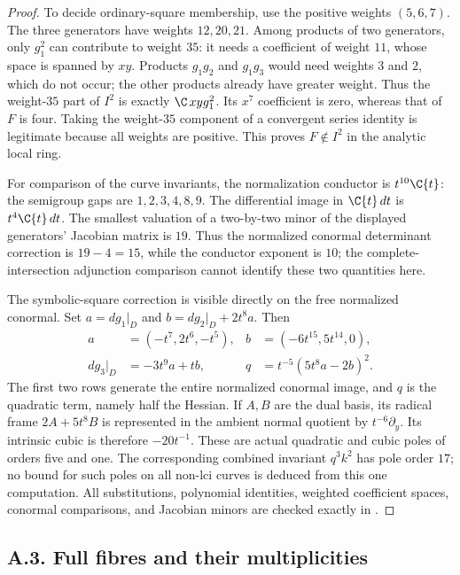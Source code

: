 \begin{proof}
To decide ordinary-square membership, use the positive weights
$(5,6,7)$. The three generators have weights $12,20,21$.
Among products of two generators, only $g_1^2$ can contribute
to weight $35$: it needs a coefficient of weight $11$, whose
space is spanned by $xy$. Products $g_1g_2$ and $g_1g_3$ would
need weights $3$ and $2$, which do not occur; the other products
already have greater weight. Thus the weight-$35$ part of $I^2$
is exactly $\C\,xyg_1^2$. Its $x^7$ coefficient is zero, whereas
that of $F$ is four. Taking the weight-$35$ component of a
convergent series identity is legitimate because all weights are
positive. This proves $F\notin I^2$ in the analytic local ring.

For comparison of the curve invariants, the normalization conductor
is $t^{10}\C\{t\}$: the semigroup gaps are $1,2,3,4,8,9$.
The differential image in $\C\{t\}\,dt$ is $t^4\C\{t\}\,dt$.
The smallest valuation of a two-by-two minor of the displayed
generators' Jacobian matrix is $19$. Thus the normalized conormal
determinant correction is $19-4=15$, while the conductor exponent
is $10$; the complete-intersection adjunction comparison cannot
identify these two quantities here.

The symbolic-square correction is visible directly on the free
normalized conormal. Set $a=dg_1|_D$ and
$b=dg_2|_D+2t^8a$. Then
\[
 \begin{aligned}
 a&=(-t^7,2t^6,-t^5),& b&=(-6t^{15},5t^{14},0),\\
 dg_3|_D&=-3t^9a+tb,&
 q&=t^{-5}(5t^8a-2b)^2.
 \end{aligned}                                                   \tag{A.NL.5}
\]
The first two rows generate the entire normalized conormal image,
and $q$ is the quadratic term, namely half the Hessian.
If $A,B$ are the dual basis, its radical frame $2A+5t^8B$
is represented in the ambient normal quotient by $t^{-6}\partial_y$.
Its intrinsic cubic is therefore $-20t^{-1}$. These are actual
quadratic and cubic poles of orders five and one. The corresponding
combined invariant $q^3k^2$ has pole order $17$; no bound for such
poles on all non-lci curves is deduced from this one computation.
All substitutions, polynomial identities, weighted coefficient
spaces, conormal comparisons, and Jacobian minors are checked
exactly in .
\end{proof}


\subsection{A.3. Full fibres and their multiplicities}


